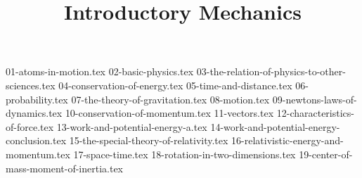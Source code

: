 

\usepackage{import}

\newcommand\bookmode{}


  \title{Introductory Mechanics}
  \maketitle

  {01-atoms-in-motion.tex}
  \clearpage
  {02-basic-physics.tex}
  \clearpage
  {03-the-relation-of-physics-to-other-sciences.tex}
  \clearpage
  {04-conservation-of-energy.tex}
  \clearpage
  {05-time-and-distance.tex}
  \clearpage
  {06-probability.tex}
  \clearpage
  {07-the-theory-of-gravitation.tex}
  \clearpage
  {08-motion.tex}
  \clearpage
  {09-newtons-laws-of-dynamics.tex}
  \clearpage
  {10-conservation-of-momentum.tex}
  \clearpage
  {11-vectors.tex}
  \clearpage
  {12-characteristics-of-force.tex}
  \clearpage
  {13-work-and-potential-energy-a.tex}
  \clearpage
  {14-work-and-potential-energy-conclusion.tex}
  \clearpage
  {15-the-special-theory-of-relativity.tex}
  \clearpage
  {16-relativistic-energy-and-momentum.tex}
  \clearpage
  {17-space-time.tex}
  \clearpage
  {18-rotation-in-two-dimensions.tex}
  \clearpage
  {19-center-of-mass-moment-of-inertia.tex}

